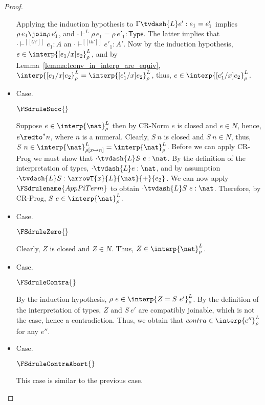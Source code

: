 \begin{proof}
\begin{itemize}
\begin{center}
    \end{center}
    Applying the induction hypothesis to $\Gamma \tvdash{L} e':e_1 = e'_1$ implies 
    $\rho\,e_1 \join \rho\,e'_1$, and $\cdot \vdash^L \rho\,e_1 = \rho\,e'_1 : \mathsf{Type}$.  
    The latter implies that $\cdot \vdash^{[[th']]}  e_1 : A$ an $\cdot \vdash^{[[th']]}  e'_1 : A'$. 
    Now by the induction hypothesis, $e \in
    \interp{[e_1/x]e_2}^L_\rho$, and by  Lemma~\ref{lemma:lconv_in_interp_are_equiv},
    $\interp{[e_1/x]e_2}^L_\rho = \interp{[e'_1/x]e_2}^L_\rho$,
    thus, $e \in \interp{[e'_1/x]e_2}^L_\rho$.
  
  \item[]Case.\ \\
    \begin{center}
      $\FSdruleSucc{}$
    \end{center}
    Suppose $e \in \interp{\nat}^L_\rho$ then by CR-Norm $e$ is closed
    and $e \in N$, hence, $e \redto^* n$, where $n$ is a numeral.
    Clearly, $S\ n$ is closed and $S\ n \in N$, thus, $S\ n \in
    \interp{\nat}^L_{\rho[x \mapsto n]} = \interp{\nat}^L_\rho$.  
    Before we can apply CR-Prog we must show that $\cdot \tvdash{L} S\ e:\nat$.
    By the definition of the interpretation of types, $\cdot \tvdash{L} e:\nat$,
    and by assumption $\cdot \tvdash{L} S:\arrowT{x}{L}{\nat}{+}{e_2}$.  We can
    now apply $\FSdrulename{AppPiTerm}$ to obtain $\cdot \tvdash{L} S\ e:\nat$.
    Therefore, by CR-Prog, $S\ e \in \interp{\nat}^L_\rho$.
  
  \item[]Case.\ \\
    \begin{center}
      $\FSdruleZero{}$
    \end{center}
    Clearly, $Z$ is closed and $Z \in N$.  Thus, $Z \in
    \interp{\nat}^L_\rho$.

  \item[]Case.\ \\
    \begin{center}
      $\FSdruleContra{}$
    \end{center}
    By the induction hypothesis, $\rho\ e \in \interp{Z =
    S\ e'}^L_\rho$.  By the
    definition of the interpretation of types, $Z$ and $S\ e'$ are
    compatibly joinable, which is not the case, hence a
    contradiction.  Thus, we obtain that $contra \in
    \interp{e''}^L_\rho$ for any $e''$.
    
  \item[]Case.\ \\
    \begin{center}
      $\FSdruleContraAbort{}$
    \end{center}
    This case is similar to the previous case.


\end{itemize}
\end{proof}
